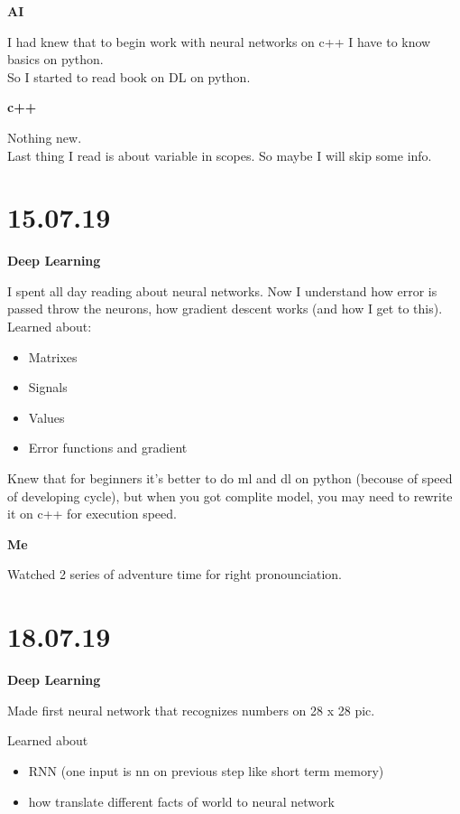 \documentclass[12pt,a4paper,titlepage]{article}
\begin{document}
\begin{center}
    \large \textbf{AI}
\end{center}
I had knew that to begin work with neural networks on c++ I have to know basics on python.\\
So I started to read book on DL on python.

\begin{center}
    \large \textbf{c++}
\end{center}
Nothing new.\\Last thing I read is about variable in scopes. So maybe I will skip some info.

\newpage
\section{15.07.19}

\begin{center}
    \large \textbf{Deep Learning}
\end{center}
I spent all day reading about neural networks. Now I understand how error is passed throw the neurons, how gradient descent works (and how I get to this).\\
Learned about:
\begin{itemize}
    \item{Matrixes}
    \item{Signals}
    \item{Values}
    \item{Error functions and gradient}
\end{itemize}
Knew that for beginners it's better to do ml and dl on python (becouse of speed of developing cycle), but when you got complite model, you may need to rewrite it on c++ for execution speed.

\begin{center}
    \large \textbf{Me}
\end{center}
Watched 2 series of adventure time for right pronounciation.

\newpage
\section{18.07.19}
\begin{center}
    \large \textbf{Deep Learning}
\end{center}

Made first neural network that recognizes numbers on 28 x 28 pic.

Learned about 
\begin{itemize}
    \item RNN (one input is nn on previous step like short term me\-mory)
    \item how translate different facts of world to neural network
\end{itemize} 
\end{document}
